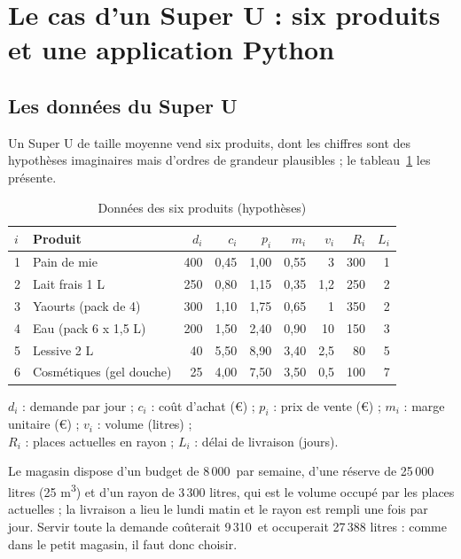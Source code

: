 \documentclass[11pt,a4paper]{article}
\newcommand{\eur}{\,\text{€}}
\begin{document}
\section{Le cas d'un Super U : six produits et une application Python}

\subsection{Les données du Super U}
Un Super U de taille moyenne vend six produits, dont les chiffres sont des hypothèses
imaginaires mais d'ordres de grandeur plausibles ; le tableau~\ref{tab:donnees6} les présente.

\begin{table}[!htbp]
\centering\small
\caption{Données des six produits (hypothèses)}\label{tab:donnees6}
\begin{tabular}{@{}llrrrrrrr@{}}
\toprule
$i$ & Produit & $d_i$ & $c_i$ & $p_i$ & $m_i$ & $v_i$ & $R_i$ & $L_i$ \\
\midrule
1 & Pain de mie            & 400 & 0,45 & 1,00 & 0,55 & 3   & 300 & 1 \\
2 & Lait frais 1 L         & 250 & 0,80 & 1,15 & 0,35 & 1,2 & 250 & 2 \\
3 & Yaourts (pack de 4)    & 300 & 1,10 & 1,75 & 0,65 & 1   & 350 & 2 \\
4 & Eau (pack 6 x 1,5 L)   & 200 & 1,50 & 2,40 & 0,90 & 10  & 150 & 3 \\
5 & Lessive 2 L            & 40  & 5,50 & 8,90 & 3,40 & 2,5 & 80  & 5 \\
6 & Cosmétiques (gel douche) & 25 & 4,00 & 7,50 & 3,50 & 0,5 & 100 & 7 \\
\bottomrule
\end{tabular}

\vspace{3pt}
\footnotesize $d_i$ : demande par jour ; $c_i$ : coût d'achat (€) ; $p_i$ : prix de vente (€) ;
$m_i$ : marge unitaire (€) ; $v_i$ : volume (litres) ;\\ $R_i$ : places actuelles en rayon ;
$L_i$ : délai de livraison (jours).
\end{table}

Le magasin dispose d'un budget de 8\,000\eur{} par semaine, d'une réserve de 25\,000 litres
(25 m\textsuperscript{3}) et d'un rayon de 3\,300 litres, qui est le volume occupé par les
places actuelles ; la livraison a lieu le lundi matin et le rayon est rempli une fois par
jour. Servir toute la demande coûterait 9\,310\eur{} et occuperait 27\,388 litres : comme dans
le petit magasin, il faut donc choisir.
\end{document}
